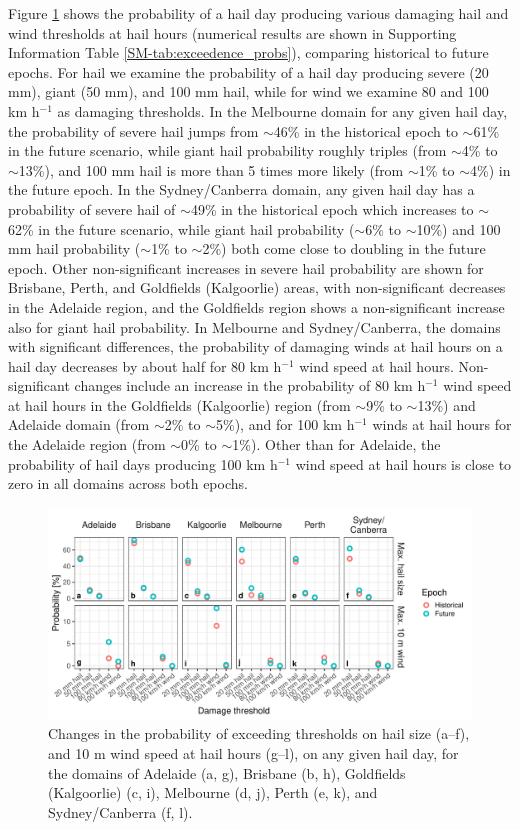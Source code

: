 \documentclass[]{agujournal2019}\usepackage[]{graphicx}\usepackage[]{xcolor}
\begin{document}
Figure \ref{fig:thresholds} shows the probability of a hail day producing various damaging hail and wind thresholds at hail hours (numerical results are shown in Supporting Information Table \ref{SM-tab:exceedence_probs}), comparing historical to future epochs. For hail we examine the probability of a hail day producing severe (20 mm), giant (50 mm), and 100 mm hail, while for wind we examine 80 and 100 km h$^{-1}$ as damaging thresholds. In the Melbourne domain for any given hail day, the probability of severe hail jumps from $\sim$46\% in the historical epoch to $\sim$61\% in the future scenario, while giant hail probability roughly triples (from $\sim$4\% to $\sim$13\%), and 100 mm hail is more than 5 times more likely (from $\sim$1\% to $\sim$4\%) in the future epoch. In the Sydney/Canberra domain, any given hail day has a probability of severe hail of $\sim$49\% in the historical epoch which increases to $\sim$62\% in the future scenario, while giant hail probability ($\sim$6\% to $\sim$10\%) and 100 mm hail probability ($\sim$1\% to $\sim$2\%) both come close to doubling in the future epoch. Other non-significant increases in severe hail probability are shown for Brisbane, Perth, and Goldfields (Kalgoorlie) areas, with non-significant decreases in the Adelaide region, and the Goldfields region shows a non-significant increase also for giant hail probability. In Melbourne and Sydney/Canberra, the domains with significant differences, the probability of damaging winds at hail hours on a hail day decreases by about half for 80 km h$^{-1}$ wind speed at hail hours. Non-significant changes include an increase in the probability of 80 km h$^{-1}$ wind speed at hail hours in the Goldfields (Kalgoorlie) region (from $\sim$9\% to $\sim$13\%) and Adelaide domain (from $\sim$2\% to $\sim$5\%), and for 100 km h$^{-1}$ winds at hail hours for the Adelaide region (from $\sim$0\% to $\sim$1\%).  Other than for Adelaide, the probability of hail days producing 100 km h$^{-1}$ wind speed at hail hours is close to zero in all domains across both epochs. 

\begin{figure}[!ht]
      \includegraphics[width=\textwidth]{figures/threshold_probs}
      \caption{Changes in the probability of exceeding thresholds on hail size (a--f), and 10 m wind speed at hail hours (g--l), on any given hail day, for the domains of Adelaide (a, g), Brisbane (b, h), Goldfields (Kalgoorlie) (c, i), Melbourne (d, j), Perth (e, k), and Sydney/Canberra (f, l).}
      \label{fig:thresholds}
\end{figure}
\end{document}
